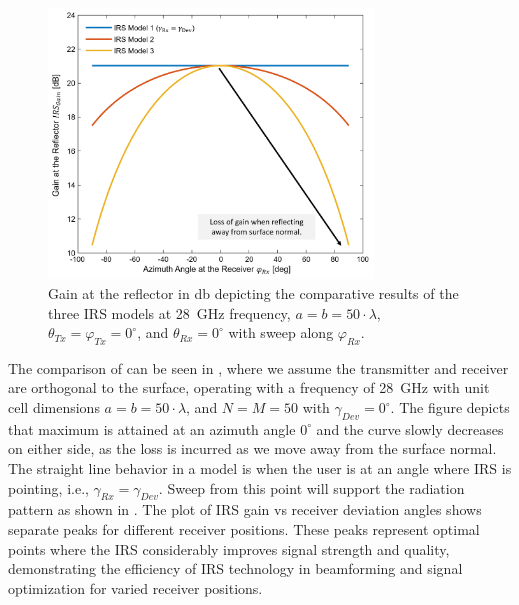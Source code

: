 \begin{figure}[H] %
	\centering
	\vspace{12pt} %
	\includegraphics*[width=0.77\textwidth]{images/Section 2 Images/3models_compare}
	\caption{Gain at the reflector in \si{\decibel} depicting the comparative results of the three IRS models \cite{8936989,ntontin2021optimal,tang2020wireless} at \SI{28}{\giga\hertz} frequency, $a=b=50\cdot\lambda$,  $\theta_{Tx}=\varphi_{Tx}=0^\circ$, and $\theta_{Rx}=0^\circ$ with sweep along $\varphi_{Rx}$.} 
	\label{fig: compare 3 models} 
\end{figure}
The comparison of  can be seen in , where we assume the transmitter and receiver are orthogonal to the surface, operating with a frequency of \SI{28}{\giga\hertz} with unit cell dimensions $a=b=\num{50}\cdot \lambda$, and $N=M=50$ with $\gamma_{Dev}=0^{\circ}$.  The figure depicts that maximum is attained at an azimuth angle $0^{\circ}$ and the curve slowly decreases on either side, as the loss is incurred as we move away from the surface normal. The straight line behavior in a model \cite{8936989} is when the user is at an angle where \ac{IRS} is pointing, i.e., $\gamma_{Rx}=\gamma_{Dev}$. Sweep from this point will support the radiation pattern as shown in . The plot of \ac{IRS} gain vs receiver deviation angles shows separate peaks for different receiver positions. These peaks represent optimal points where the \ac{IRS} considerably improves signal strength and quality, demonstrating the efficiency of \ac{IRS} technology in beamforming and signal optimization for varied receiver positions.

